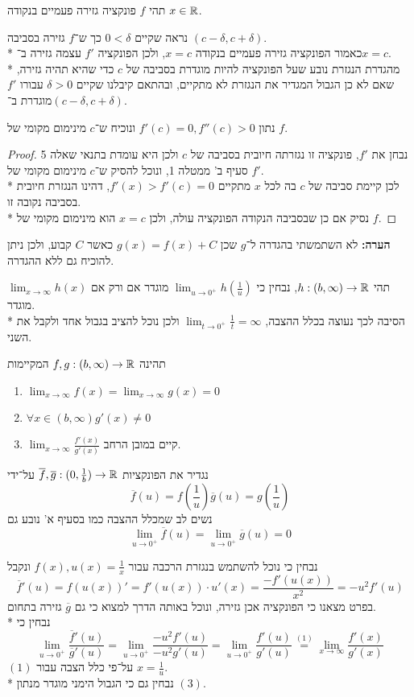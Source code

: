 \Question{}
תהי $f$ פונקציה גזירה פעמיים בנקודה $x \in \mathbb{R}$.

\Subquestion{}
נראה שקיים $0 < \delta$ כך ש־$f$ גזירה בסביבה $(c - \delta, c + \delta)$. \\*
כאמור הפונקציה גזירה פעמיים בנקודה $x = c$, ולכן הפונקציה $f'$ עצמה גזירה ב־$x = c$. \\*
מהגדרת הנגזרת נובע שעל הפונקציה להיות מוגדרת בסביבה של $c$ כדי שהיא תהיה גזירה, שאם לא כן הגבול המגדיר את הנגזרת לא מתקיים, ובהתאם קיבלנו שקיים $\delta > 0$ עבורו $f'$ מוגדרת ב־$(c - \delta, c + \delta)$.

\Subquestion{}
נתון $f'(c) = 0, f''(c) > 0$ ונוכיח ש־$c$ מינימום מקומי של $f$.
\begin{proof}
	נבחן את $f'$, פונקציה זו נגזרתה חיובית בסביבה של $c$ ולכן היא עומדת בתנאי שאלה 5 סעיף ב' ממטלה 1, ונוכל להסיק ש־$c$ מינימום מקומי של $f'$. \\*
	לכן קיימת סביבה של $c$ בה לכל $x$ מתקיים $f'(x) > f'(c) = 0$, דהינו הנגזרת חיובית בסביבה נקובה זו. \\*
	נסיק אם כן שבסביבה הנקודה הפונקציה עולה, ולכן $x = c$ הוא מינימום מקומי של $f$.
\end{proof}
\textbf{הערה:} לא השתמשתי בהגדרה ל־$g$ שכן $g(x) = f(x) + C$ כאשר $C$ קבוע, ולכן ניתן להוכיח גם ללא ההגדרה.

\Question{}
\Subquestion{}
תהי $h : (b, \infty) \to \mathbb{R}$, נבחין כי $\lim_{u \to 0^+} h(\frac{1}{u})$ מוגדר אם ורק אם $\lim_{x \to \infty} h(x)$ מוגדר. \\*
הסיבה לכך נעוצה בכלל ההצבה, $\lim_{t \to 0^+} \frac{1}{t} = \infty$ ולכן נוכל להציב בגבול אחד ולקבל את השני.

תהינה $f, g : (b, \infty) \to \mathbb{R}$ המקיימות
\begin{enumerate}
	\item $\lim_{x \to \infty} f(x) = \lim_{x \to \infty} g(x) = 0$
	\item $\forall x \in (b, \infty) g'(x) \ne 0$
	\item $\lim_{x \to \infty} \frac{f'(x)}{g'(x)}$ קיים במובן הרחב.
\end{enumerate}

\Subquestion{}
נגדיר את הפונקציות $\overline{f}, \overline{g} : (0, \frac{1}{b}) \to \mathbb{R}$ על־ידי
\[
	\overline{f}(u) = f(\frac{1}{u})
	\overline{g}(u) = g(\frac{1}{u})
\]
נשים לב שמכלל ההצבה כמו בסעיף א' נובע גם
\[
	\lim_{u \to 0^+} \overline{f}(u)
	= \lim_{u \to 0^+} \overline{g}(u)
	= 0
\]

\Subquestion{}
נבחין כי נוכל להשתמש בנגזרת הרכבה עבור $f(x), u(x) = \frac{1}{x}$ ונקבל
\[
	\overline{f}'(u) = f(u(x))' = f'(u(x)) \cdot u'(x) = \frac{-f'(u(x))}{x^2} = - u^2 f'(u)
\]
בפרט מצאנו כי הפונקציה אכן גזירה, ונוכל באותה הדרך למצוא כי גם $\overline{g}$ גזירה בתחום. \\*
נבחין כי
\[
	\lim_{u \to 0^+} \frac{\overline{f}'(u)}{\overline{g}'(u)}
	= \lim_{u \to 0^+} \frac{-u^2 f'(u)}{-u^2 g'(u)}
	= \lim_{u \to 0^+} \frac{f'(u)}{g'(u)}
	\overset{(1)}{=} \lim_{x \to \infty} \frac{f'(x)}{g'(x)}
\]
$(1)$ על־פי כלל הצבה עבור $x = \frac{1}{u}$. \\*
נבחין גם כי הגבול הימני מוגדר מנתון $(3)$.

